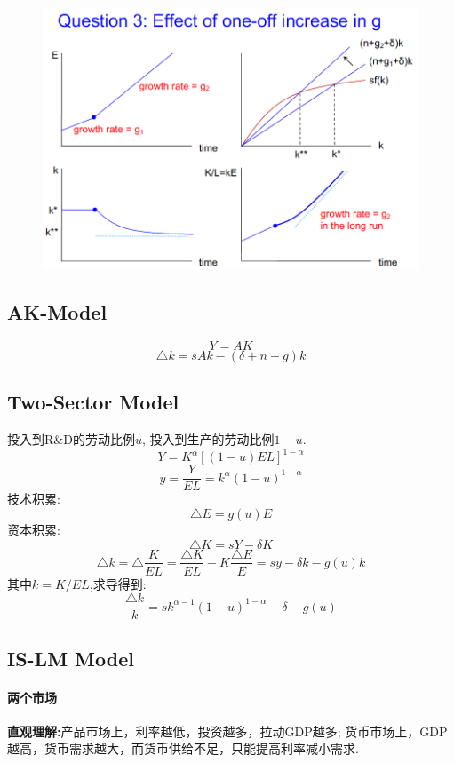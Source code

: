 \documentclass[UTF8, onecolumn, a4paper, 12pt]{article}
\begin{document}
\begin{center}
\begin{figure}[htb]
\begin{minipage}[b]{\linewidth}
{\begin{minipage}[b]{0.46\linewidth}
					\includegraphics[width=\linewidth]{g}\vspace{8pt}
				\end{minipage}
			}
		\end{minipage}
	\end{figure}
\end{center}
\subsection{AK-Model}
$$Y = AK$$
$$\triangle k = sAk - (\delta+n+g) k$$
\subsection{Two-Sector Model}
投入到R\&D的劳动比例$u$, 投入到生产的劳动比例$1-u$.
$$Y = K^{\alpha}[(1-u)EL]^{1-\alpha}$$
$$y = \frac{Y}{EL} = k^{\alpha}(1-u)^{1-\alpha}$$
技术积累:
$$\triangle E = g(u)E$$
资本积累:
$$\triangle K = sY - \delta K$$
$$\triangle k = \triangle\frac{K}{EL} = \frac{\triangle K}{EL} - K\frac{\triangle E}{E}= sy - \delta k - g(u)k$$
其中$k = K/EL$,求导得到:
$$\frac{\triangle k}{k} = sk^{\alpha-1}(1-u)^{1-\alpha}-\delta -g(u)$$

\subsection{IS-LM Model}
\paragraph{两个市场}
\textbf{直观理解:}产品市场上，利率越低，投资越多，拉动GDP越多; 货币市场上，GDP越高，货币需求越大，而货币供给不足，只能提高利率减小需求.
\end{document}
